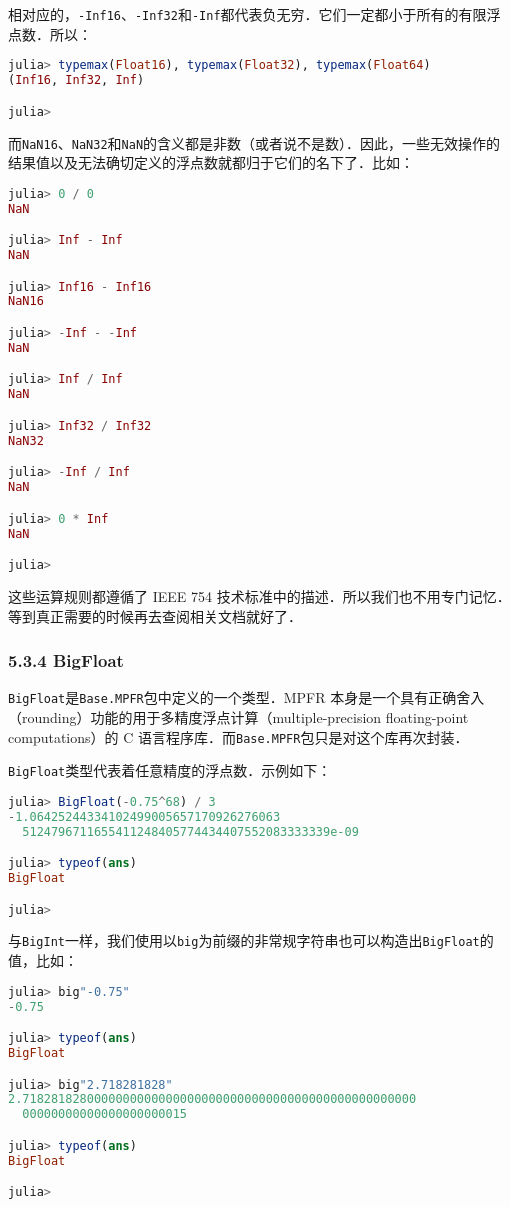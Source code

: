 相对应的，\verb|-Inf16|、\verb|-Inf32|和\verb|-Inf|都代表负无穷．它们一定都小于所有的有限浮点数．所以：
\begin{lstlisting}[language=julia]
julia> typemax(Float16), typemax(Float32), typemax(Float64)
(Inf16, Inf32, Inf)

julia> 
\end{lstlisting}

而\verb|NaN16|、\verb|NaN32|和\verb|NaN|的含义都是非数（或者说不是数）．因此，一些无效操作的结果值以及无法确切定义的浮点数就都归于它们的名下了．比如：
\begin{lstlisting}[language=julia]
julia> 0 / 0
NaN

julia> Inf - Inf
NaN

julia> Inf16 - Inf16
NaN16

julia> -Inf - -Inf
NaN

julia> Inf / Inf
NaN

julia> Inf32 / Inf32
NaN32

julia> -Inf / Inf
NaN

julia> 0 * Inf
NaN

julia> 
\end{lstlisting}

这些运算规则都遵循了 IEEE 754 技术标准中的描述．所以我们也不用专门记忆．等到真正需要的时候再去查阅相关文档就好了．

\subsubsection{5.3.4 BigFloat}

\verb|BigFloat|是\verb|Base.MPFR|包中定义的一个类型．MPFR 本身是一个具有正确舍入（rounding）功能的用于多精度浮点计算（multiple-precision floating-point computations）的 C 语言程序库．而\verb|Base.MPFR|包只是对这个库再次封装．

\verb|BigFloat|类型代表着任意精度的浮点数．示例如下：
\begin{lstlisting}[language=julia]
julia> BigFloat(-0.75^68) / 3
-1.06425244334102499005657170926276063
  5124796711655411248405774434407552083333339e-09

julia> typeof(ans)
BigFloat

julia> 
\end{lstlisting}

与\verb|BigInt|一样，我们使用以\verb|big|为前缀的非常规字符串也可以构造出\verb|BigFloat|的值，比如：
\begin{lstlisting}[language=julia]
julia> big"-0.75"
-0.75

julia> typeof(ans)
BigFloat

julia> big"2.718281828"
2.7182818280000000000000000000000000000000000000000000000
  00000000000000000000015

julia> typeof(ans)
BigFloat

julia> 
\end{lstlisting}

